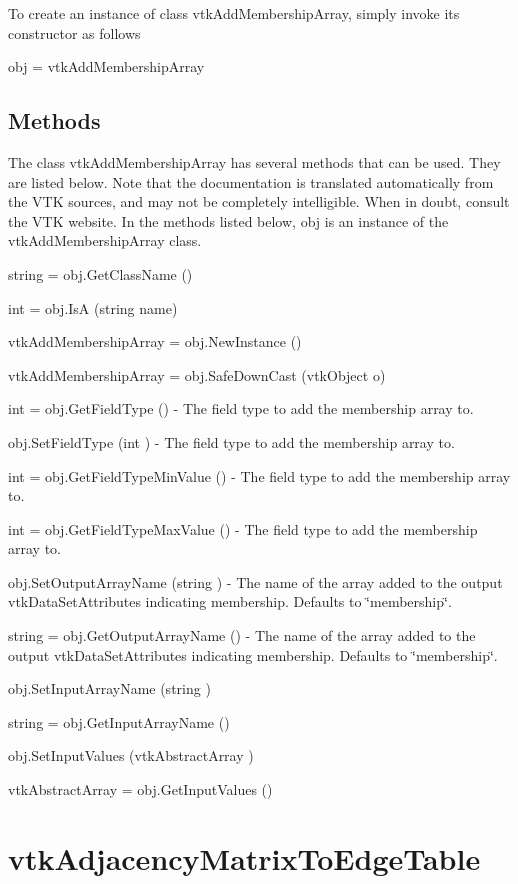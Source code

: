 To create an instance of class vtk\-Add\-Membership\-Array, simply invoke its constructor as follows \begin{DoxyVerb}  obj = vtkAddMembershipArray
\end{DoxyVerb}
 \hypertarget{vtkwidgets_vtkxyplotwidget_Methods}{}\subsection{Methods}\label{vtkwidgets_vtkxyplotwidget_Methods}
The class vtk\-Add\-Membership\-Array has several methods that can be used. They are listed below. Note that the documentation is translated automatically from the V\-T\-K sources, and may not be completely intelligible. When in doubt, consult the V\-T\-K website. In the methods listed below, {\ttfamily obj} is an instance of the vtk\-Add\-Membership\-Array class. 
\begin{DoxyItemize}
\item {\ttfamily string = obj.\-Get\-Class\-Name ()}  
\item {\ttfamily int = obj.\-Is\-A (string name)}  
\item {\ttfamily vtk\-Add\-Membership\-Array = obj.\-New\-Instance ()}  
\item {\ttfamily vtk\-Add\-Membership\-Array = obj.\-Safe\-Down\-Cast (vtk\-Object o)}  
\item {\ttfamily int = obj.\-Get\-Field\-Type ()} -\/ The field type to add the membership array to.  
\item {\ttfamily obj.\-Set\-Field\-Type (int )} -\/ The field type to add the membership array to.  
\item {\ttfamily int = obj.\-Get\-Field\-Type\-Min\-Value ()} -\/ The field type to add the membership array to.  
\item {\ttfamily int = obj.\-Get\-Field\-Type\-Max\-Value ()} -\/ The field type to add the membership array to.  
\item {\ttfamily obj.\-Set\-Output\-Array\-Name (string )} -\/ The name of the array added to the output vtk\-Data\-Set\-Attributes indicating membership. Defaults to \char`\"{}membership\char`\"{}.  
\item {\ttfamily string = obj.\-Get\-Output\-Array\-Name ()} -\/ The name of the array added to the output vtk\-Data\-Set\-Attributes indicating membership. Defaults to \char`\"{}membership\char`\"{}.  
\item {\ttfamily obj.\-Set\-Input\-Array\-Name (string )}  
\item {\ttfamily string = obj.\-Get\-Input\-Array\-Name ()}  
\item {\ttfamily obj.\-Set\-Input\-Values (vtk\-Abstract\-Array )}  
\item {\ttfamily vtk\-Abstract\-Array = obj.\-Get\-Input\-Values ()}  
\end{DoxyItemize}\hypertarget{vtkinfovis_vtkadjacencymatrixtoedgetable}{}\section{vtk\-Adjacency\-Matrix\-To\-Edge\-Table}\label{vtkinfovis_vtkadjacencymatrixtoedgetable}
